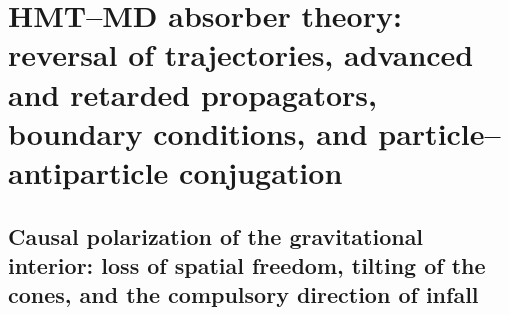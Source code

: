 \chapter{HMT--MD absorber theory: reversal of trajectories, advanced and retarded propagators, boundary conditions, and particle--antiparticle conjugation}
\label{chap:md-absorbedor-definitivo}
\begingroup
\let\HMTOwnerSection\section
\let\HMTOwnerSubsection\subsection
\let\HMTOwnerSubsubsection\subsubsection
\let\HMTOwnerParagraph\paragraph
\let\chapter\HMTOwnerSection
\let\section\HMTOwnerSubsection
\let\subsection\HMTOwnerSubsubsection
\let\subsubsection\HMTOwnerParagraph

\endgroup


\chapter{Causal polarization of the gravitational interior: loss of spatial freedom, tilting of the cones, and the compulsory direction of infall}
\label{chap:md-polarizacion-causal-interior}


